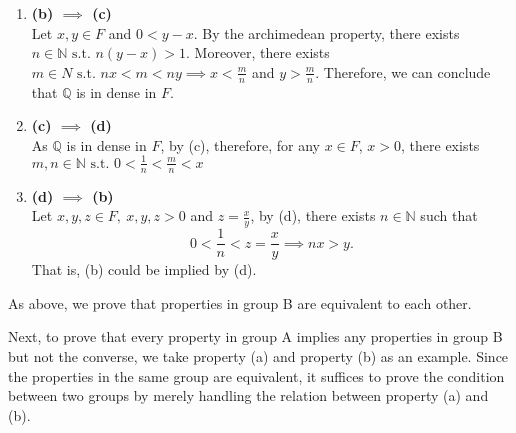 \documentclass[a4pap er]{article}
\newcommand{\N}{\mathbb{N}}
\newcommand{\Q}{\mathbb{Q}}
\newcommand{\st}{\text{ s.t. }}
\theoremstyle{plain}
\begin{document}
\begin{enumerate}
    \item \textbf{(b) $\implies$ (c)} \\
Let $x, y \in F$ and $0 < y-x$. By the archimedean
property, there exists $n \in \N \st n(y-x) > 1$.
Moreover, there exists $m \in N \st nx < m < ny \implies
x < \frac{m}{n}$ and $y > \frac{m}{n}$. Therefore, we can
conclude that $\Q$ is in dense in $F$.
\item \textbf{(c) $\implies$ (d)} \\
    As $\Q$ is in dense in $F$, by (c), therefore, 
    for any $x \in F$, $x>0$, there exists
    $m,n \in \N \st 0 < \frac{1}{n} < \frac{m}{n} < x$

\item \textbf{(d) $\implies$ (b)} \\
    Let $x,y,z \in F, \ x,y,z > 0$ and $z = \frac{x}{y}$, 
    by (d), there exists $n \in \N$ such that
    \[
    0 < \frac{1}{n} < z = \frac{x}{y}
    \implies nx > y.
    \]
    That is, (b) could be implied by (d).
\end{enumerate}
As above, we prove that properties in group B are equivalent
to each other.

Next, to prove that every property in group A implies any
properties in group B but not the converse, we take 
property (a) and property (b) as an example. Since the 
properties in the same group are equivalent, it suffices to
prove the condition between two groups by merely handling 
the relation between property (a) and (b).
\end{document}
